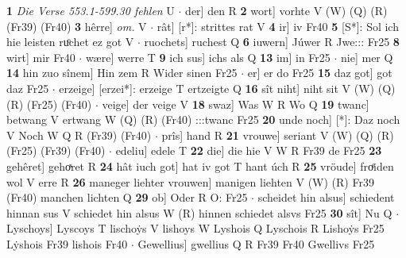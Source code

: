 \documentclass[8pt,a4paper,notitlepage]{article}
\begin{document}
\begin{table}[ht]
\begin{minipage}[t]{0.5\linewidth}
\textbf{1} \textit{Die Verse 553.1-599.30 fehlen} U   $\cdot$ der] den R \textbf{2} wort] vorhte V (W) (Q) (R) (Fr39) (Fr40) \textbf{3} hêrre] \textit{om.} V  $\cdot$ rât] [r*]: strittes rat V \textbf{4} ir] iv Fr40 \textbf{5} [S*]: Sol ich hie leisten ruͦchet ez got V  $\cdot$ ruochets] ruchest Q \textbf{6} iuwern] Júwer R Jwe::: Fr25 \textbf{8} wirt] mir Fr40  $\cdot$ wære] werre T \textbf{9} ich sus] ichs als Q \textbf{13} im] in Fr25  $\cdot$ nie] mer Q \textbf{14} hin zuo sînem] Hin zem R Wider sinen Fr25  $\cdot$ er] er do Fr25 \textbf{15} daz got] got daz Fr25  $\cdot$ erzeige] [erzei*]: erzeige T ertzeigte Q \textbf{16} sît niht] niht sit V (W) (Q) (R) (Fr25) (Fr40)  $\cdot$ veige] der veige V \textbf{18} swaz] Was W R Wo Q \textbf{19} twanc] betwang V ertwang W (Q) (R) (Fr40) :::twanc Fr25 \textbf{20} unde noch] [*]: Daz noch V Noch W Q R (Fr39) (Fr40)  $\cdot$ prîs] hand R \textbf{21} vrouwe] seriant V (W) (Q) (R) (Fr25) (Fr39) (Fr40)  $\cdot$ edeliu] edele T \textbf{22} die] die hie V W R Fr39 de Fr25 \textbf{23} gehêret] gehoͯret R \textbf{24} hât iuch got] hat iv got T hant úch R \textbf{25} vröude] froͤiden wol V erre R \textbf{26} maneger liehter vrouwen] manigen liehten V (W) (R) Fr39 (Fr40) manchen lichten Q \textbf{29} ob] Oder R O: Fr25  $\cdot$ scheidet hin alsus] schiedent hinnan sus V schiedet hin alsus W (R) hinnen schiedet alsvs Fr25 \textbf{30} sît] Nu Q  $\cdot$ Lyschoys] Lyscoys T lischoẏs V lishoys W Lyshois Q Lyschois R Lishoẏs Fr25 Lẏshois Fr39 lishois Fr40  $\cdot$ Gewellius] gwellius Q R Fr39 Fr40 Gwellivs Fr25 \newline
\end{minipage}
\end{table}
\end{document}
